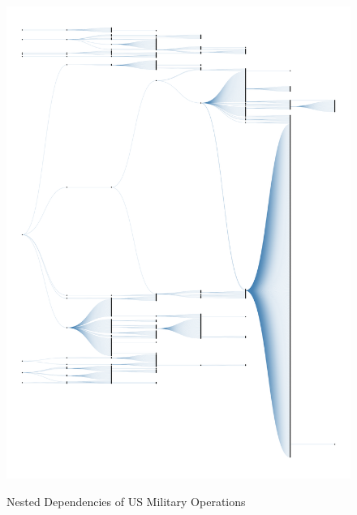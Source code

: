 \documentclass[fleqn,12pt]{article}
\begin{document}
\clearpage
{}
\newpage
\begin{figure}[h]
	\begin{center}
		\caption{Nested Dependencies of US Military Operations}
		{\includegraphics[height = \textheight]{fig-dendrogram-1.png}}
		\label{fig:fig-dendrogram-1}
		\vspace{0.1 in}
	\end{center}
\end{figure}
\end{document}
